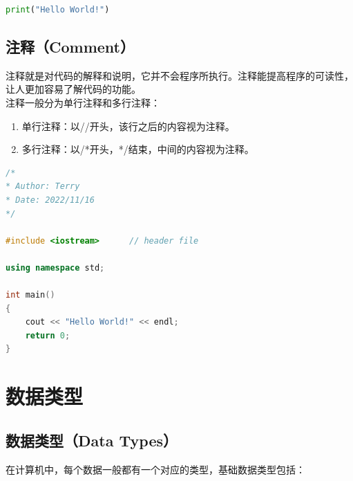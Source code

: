 \vspace{0.5cm}


\begin{lstlisting}[language=Python]
print("Hello World!")
\end{lstlisting}

\vspace{0.5cm}

\subsection{注释（Comment）}

注释就是对代码的解释和说明，它并不会程序所执行。注释能提高程序的可读性，让人更加容易了解代码的功能。\\

注释一般分为单行注释和多行注释：

\begin{enumerate}
	\item 单行注释：以//开头，该行之后的内容视为注释。
	\item 多行注释：以/*开头，*/结束，中间的内容视为注释。
\end{enumerate}

\vspace{0.5cm}


\begin{lstlisting}[language=C++]
/*
* Author: Terry
* Date: 2022/11/16
*/

#include <iostream>      // header file

using namespace std;

int main()
{
	cout << "Hello World!" << endl;
	return 0;
}
\end{lstlisting}

\newpage

\section{数据类型}

\subsection{数据类型（Data Types）}

在计算机中，每个数据一般都有一个对应的类型，基础数据类型包括：

